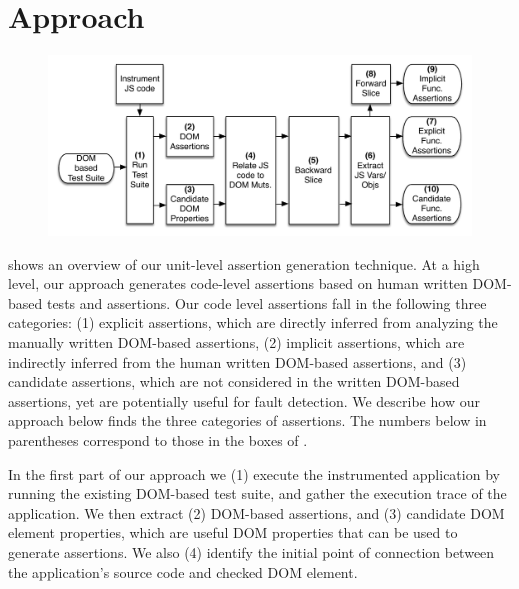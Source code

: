 \section{Approach} \label{Sec:approach}
\begin{figure}[!t]
  \centering
  \includegraphics[width=1\hsize]{fig/approachDiagram}
  \vspace{-0.3in} 
  \label{Fig:approachDiagram}
  \vspace{-0.2in} 
\end{figure}

 shows an overview of our unit-level assertion generation technique.
At a high level, our approach generates code-level assertions based on human written DOM-based tests and assertions. Our code level assertions fall in the following three categories: (1) explicit assertions, which are directly inferred from analyzing the manually written DOM-based assertions, (2) implicit assertions, which are indirectly inferred from the human written DOM-based assertions, and (3) candidate assertions, which are not considered in the written DOM-based assertions, yet are potentially useful for fault detection. We describe how our approach below finds the three categories of assertions. The numbers below in parentheses correspond to those in the boxes of .

In the first part of our approach we (1) execute the instrumented application by running the existing DOM-based test suite, and gather the execution trace of the application. We then extract (2) DOM-based assertions, and (3) candidate DOM element properties, which are useful DOM properties that can be used to generate assertions. We also (4) identify the initial point of connection between the application's source code and checked DOM element. 

